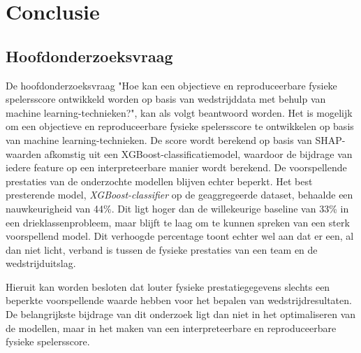 
\chapter{Conclusie}%
\label{ch:conclusie}

\section{Hoofdonderzoeksvraag}

De hoofdonderzoeksvraag "Hoe kan een objectieve en reproduceerbare fysieke spelersscore ontwikkeld worden op basis van wedstrijddata met behulp van machine learning-technieken?", kan als volgt beantwoord worden. Het is mogelijk om een objectieve en reproduceerbare fysieke spelersscore te ontwikkelen op basis van machine learning-technieken. De score wordt berekend op basis van SHAP-waarden afkomstig uit een XGBoost-classificatiemodel, waardoor de bijdrage van iedere feature op een interpreteerbare manier wordt berekend. De voorspellende prestaties van de onderzochte modellen blijven echter beperkt. Het best presterende model, \emph{XGBoost-classifier} op de geaggregeerde dataset, behaalde een nauwkeurigheid van 44\%. Dit ligt hoger dan de willekeurige baseline van 33\% in een drieklassenprobleem, maar blijft te laag om te kunnen spreken van een sterk voorspellend model. Dit verhoogde percentage toont echter wel aan dat er een, al dan niet licht, verband is tussen de fysieke prestaties van een team en de wedstrijduitslag.

Hieruit kan worden besloten dat louter fysieke prestatiegegevens slechts een beperkte voorspellende waarde hebben voor het bepalen van wedstrijdresultaten. De belangrijkste bijdrage van dit onderzoek ligt dan niet in het optimaliseren van de modellen, maar in het maken van een interpreteerbare en reproduceerbare fysieke spelersscore.

